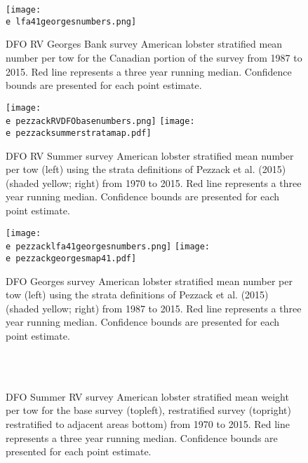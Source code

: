 \documentclass[11pt]{article}
\newcommand{\e}{/backup/bio_data/bio.lobster/figures/} %
\begin{document}
\begin{figure}

    \texttt{[image: \\e lfa41georgesnumbers.png]}
    \caption{DFO RV Georges Bank survey American lobster stratified mean number per tow for the Canadian portion of the survey from 1987 to 2015. Red line represents a three year running median. Confidence bounds are presented for each point estimate.}

\end{figure}

\begin{landscape}
\begin{figure}
\centering
    \texttt{[image: \\e pezzackRVDFObasenumbers.png]} 
    \texttt{[image: \\e pezzacksummerstratamap.pdf]} 
    
    \caption{DFO RV Summer survey American lobster stratified mean number per tow (left) using the strata definitions of Pezzack et al. (2015) (shaded yellow; right) from 1970 to 2015. Red line represents a three year running median. Confidence bounds are presented for each point estimate.}

\end{figure}
\end{landscape}


\begin{landscape}
\begin{figure}
\centering
    \texttt{[image: \\e pezzacklfa41georgesnumbers.png]} 
    \texttt{[image: \\e pezzackgeorgesmap41.pdf]} 
    
    \caption{DFO Georges survey American lobster stratified mean number per tow (left) using the strata definitions of Pezzack et al. (2015) (shaded yellow; right) from 1987 to 2015. Red line represents a three year running median. Confidence bounds are presented for each point estimate.}

\end{figure}
\end{landscape}



\begin{figure}
\centering
{}
\\
\\

\caption{DFO Summer RV survey American lobster stratified mean weight per tow for the base survey (topleft), restratified survey (topright) restratified to adjacent areas bottom) from 1970 to 2015. Red line represents a three year running median. Confidence bounds are presented for each point estimate.}
\end{figure}
\clearpage
\end{document}
